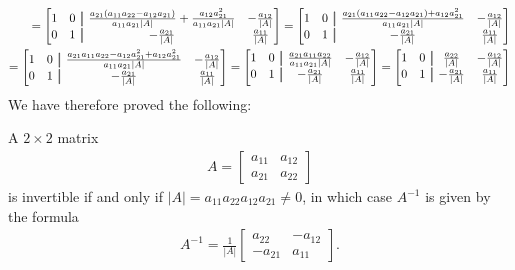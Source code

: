 \documentclass[12pt,letterpaper,reqno]{article}
\numberwithin{equation}{section}
\newcommand\aug{\fboxsep=-\fboxrule\!\!\!\fbox{\strut}\!\!\!}
\begin{document}
\begin{align*}
	=\begin{bmatrix}
		1 & 0 & \aug & \frac{a_{21}(a_{11}a_{22}-a_{12}a_{21})}{a_{11}a_{21}|A|}+\frac{a_{12}a_{21}^2}{a_{11}a_{21}|A|} & -\frac{a_{12}}{|A|} \\
		0 & 1 & \aug & -\frac{a_{21}}{|A|} & \frac{a_{11}}{|A|} 
	\end{bmatrix}=\begin{bmatrix}
		1 & 0 & \aug & \frac{a_{21}(a_{11}a_{22}-a_{12}a_{21})+a_{12}a_{21}^2}{a_{11}a_{21}|A|} & -\frac{a_{12}}{|A|} \\
		0 & 1 & \aug & -\frac{a_{21}}{|A|} & \frac{a_{11}}{|A|} 
	\end{bmatrix} \\
	=\begin{bmatrix}
		1 & 0 & \aug & \frac{a_{21}a_{11}a_{22}-a_{12}a_{21}^2+a_{12}a_{21}^2}{a_{11}a_{21}|A|} & -\frac{a_{12}}{|A|} \\
		0 & 1 & \aug & -\frac{a_{21}}{|A|} & \frac{a_{11}}{|A|} 
	\end{bmatrix}=\begin{bmatrix}
		1 & 0 & \aug & \frac{a_{21}a_{11}a_{22}}{a_{11}a_{21}|A|} & -\frac{a_{12}}{|A|} \\
		0 & 1 & \aug & -\frac{a_{21}}{|A|} & \frac{a_{11}}{|A|} 
	\end{bmatrix}=\begin{bmatrix}
		1 & 0 & \aug & \frac{a_{22}}{|A|} & -\frac{a_{12}}{|A|} \\
		0 & 1 & \aug & -\frac{a_{21}}{|A|} & \frac{a_{11}}{|A|} 
	\end{bmatrix}
\end{align*}
We have therefore proved the following:
\begin{prop}
A $2 \times 2$ matrix 
\begin{align*}
	A=\begin{bmatrix}
		a_{11} & a_{12} \\
		a_{21} & a_{22}
	\end{bmatrix}
\end{align*}
is invertible if and only if $|A|=a_{11}a_{22}a_{12}a_{21} \neq 0$, in which case $A^{-1}$ is given by the formula
\begin{align*}
	A^{-1}=\frac{1}{|A|}\begin{bmatrix}
		a_{22} & -a_{12} \\
		-a_{21} & a_{11}
	\end{bmatrix}.
\end{align*}	
\end{prop}
\end{document}
